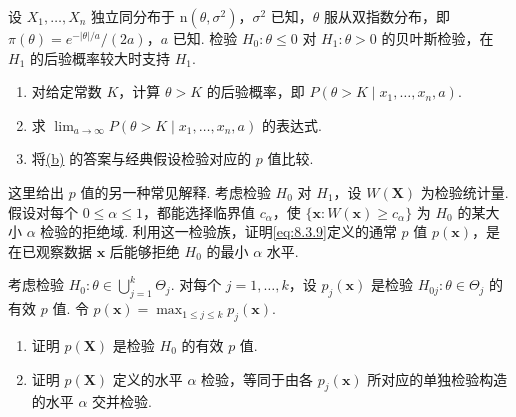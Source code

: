 \begin{exercise}\label{exercise:8.50}
设 $X_1,\ldots,X_n$ 独立同分布于 $\mathrm n(\theta,\sigma^2)$，$\sigma^2$ 已知，$\theta$ 服从双指数分布，即 $\pi(\theta)=e^{-|\theta|/a}/(2a)$，$a$ 已知. 检验 $H_0:\theta\le0$ 对 $H_1:\theta>0$ 的贝叶斯检验，在 $H_1$ 的后验概率较大时支持 $H_1$.
\begin{enumerate}
\item 对给定常数 $K$，计算 $\theta>K$ 的后验概率，即 $P(\theta>K\mid x_1,\ldots,x_n,a)$.
\item{}\label{itm:exercise:8.50:b} 求 $\lim_{a\to\infty}P(\theta>K\mid x_1,\ldots,x_n,a)$ 的表达式.
\item 将\hyperref[itm:exercise:8.50:b]{(b)} 的答案与经典假设检验对应的 $p$ 值比较.
\end{enumerate}
\end{exercise}
\begin{exercise}\label{exercise:8.51}
这里给出 $p$ 值的另一种常见解释. 考虑检验 $H_0$ 对 $H_1$，设 $W(\boldsymbol X)$ 为检验统计量. 假设对每个 $0\le\alpha\le1$，都能选择临界值 $c_\alpha$，使 $\{\boldsymbol x:W(\boldsymbol x)\ge c_\alpha\}$ 为 $H_0$ 的某大小 $\alpha$ 检验的拒绝域. 利用这一检验族，证明\eqref{eq:8.3.9}定义的通常 $p$ 值 $p(\boldsymbol x)$，是在已观察数据 $\boldsymbol x$ 后能够拒绝 $H_0$ 的最小 $\alpha$ 水平.
\end{exercise}
\begin{exercise}\label{exercise:8.52}
考虑检验 $H_0:\theta\in\bigcup_{j=1}^k\Theta_j$. 对每个 $j=1,\ldots,k$，设 $p_j(\boldsymbol x)$ 是检验 $H_{0j}:\theta\in\Theta_j$ 的有效 $p$ 值. 令 $p(\boldsymbol x)=\max_{1\le j\le k}p_j(\boldsymbol x)$.
\begin{enumerate}
\item 证明 $p(\boldsymbol X)$ 是检验 $H_0$ 的有效 $p$ 值.
\item 证明 $p(\boldsymbol X)$ 定义的水平 $\alpha$ 检验，等同于由各 $p_j(\boldsymbol x)$ 所对应的单独检验构造的水平 $\alpha$ 交并检验.
\end{enumerate}
\end{exercise}
